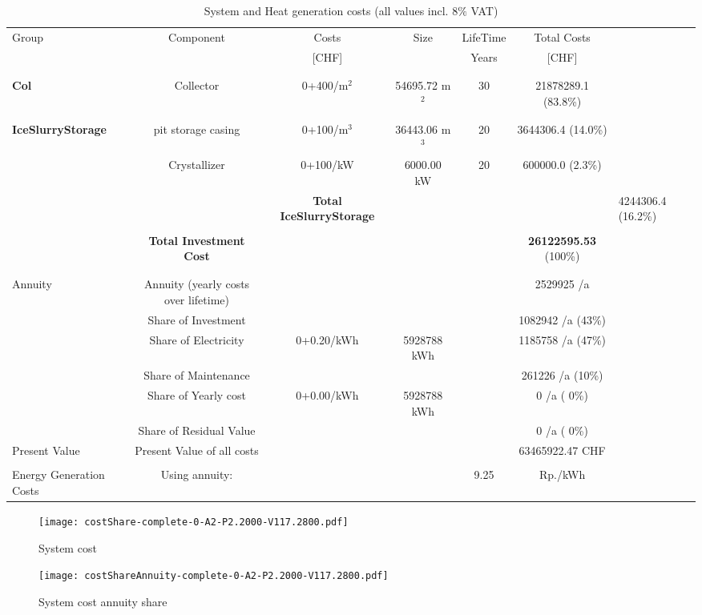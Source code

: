 \documentclass[english]{SPFShortReport}
\begin{document}
\begin{table}[!ht]
\centering
\caption{System and Heat generation costs (all values incl. 8$\%$ VAT) }
\begin{adjustbox}{max width =\textwidth}
\begin{tabular}{l | c c c c c } 
\hline
\hline
Group &Component &Costs &Size &LifeTime &Total Costs \\ 
 & &[CHF] & &Years &[CHF]\\ 
\hline
\\
\hline \\
\textbf{Col} & Collector & 0+400/m$^2$ & 54695.72 m$^2$ & 30 & 21878289.1 (83.8\%) \\
\hline \\
\hline \\
\textbf{IceSlurryStorage} & pit storage casing & 0+100/m$^3$ & 36443.06 m$^3$ & 20 & 3644306.4 (14.0\%) \\
 & Crystallizer & 0+100/kW & 6000.00 kW & 20 & 600000.0 (2.3\%) \\
&
 & \textbf{Total IceSlurryStorage} & & & & 4244306.4 (16.2\%) \\
\hline \\
 & \textbf{Total Investment Cost} & & & & \textbf{26122595.53} (100\%) \\ 
\hline \\ 
\hline \\ 
Annuity & Annuity (yearly costs over lifetime)  &&& & 2529925 /a  \\
 & Share of Investment & &&& 1082942 /a (43\%) \\
 & Share of Electricity & 0+0.20/kWh & 5928788 kWh &  & 1185758 /a (47\%)\\
 & Share of Maintenance & &&& 261226 /a (10\%)\\ 
 & Share of Yearly cost & 0+0.00/kWh & 5928788 kWh & &  0 /a ( 0\%)\\
 & Share of Residual Value &&& &  0 /a ( 0\%)\\
Present Value  & Present Value of all costs  & &&& 63465922.47 CHF \\
\hline \\ 
 Energy Generation Costs & Using annuity: &&& 9.25 & Rp./kWh \\
\hline
\hline
\end{tabular}
\end{adjustbox}
\label{CostsTable}
\end{table}
\begin{figure}[!htbp]
\begin{center}
\texttt{[image: costShare-complete-0-A2-P2.2000-V117.2800.pdf]}
\caption{System cost}
\label{systemCost}
\end{center}
\end{figure}
\begin{figure}[!htbp]
\begin{center}
\texttt{[image: costShareAnnuity-complete-0-A2-P2.2000-V117.2800.pdf]}
\caption{System cost annuity share}
\label{systemCostannuity}
\end{center}
\end{figure}
\end{document}
